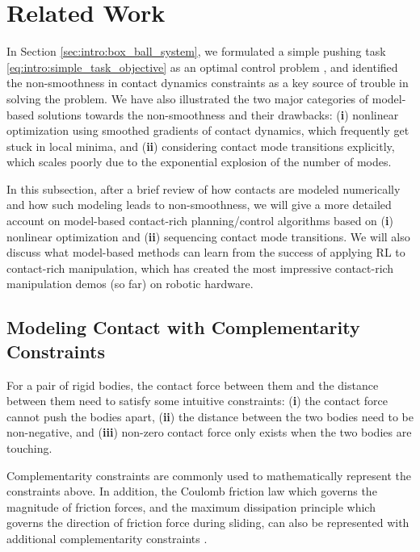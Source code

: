 \section{Related Work}
In Section \ref{sec:intro:box_ball_system}, we formulated a simple pushing task \eqref{eq:intro:simple_task_objective} as an optimal control problem \cite[]{underactuated}, and identified the non-smoothness in contact dynamics constraints as a key source of trouble in solving the problem. We have also illustrated the two major categories of model-based solutions towards the non-smoothness and their drawbacks: (\textbf{i}) nonlinear optimization using smoothed gradients of contact dynamics, which frequently get stuck in local minima, and (\textbf{ii}) considering contact mode transitions explicitly, which scales poorly due to the exponential explosion of the number of modes. 

In this subsection, after a brief review of how contacts are modeled numerically and how such modeling leads to non-smoothness, we will give a more detailed account on model-based contact-rich planning/control algorithms based on (\textbf{i}) nonlinear optimization and (\textbf{ii}) sequencing contact mode transitions. We will also discuss what model-based methods can learn from the success of applying RL to contact-rich manipulation, which has created the most impressive contact-rich manipulation demos (so far) on robotic hardware.


\subsection{Modeling Contact with Complementarity Constraints} 
\label{sec:intro:complementarity_constraints}
For a pair of rigid bodies, the contact force between them and the distance between them need to satisfy some intuitive constraints: (\textbf{i}) the contact force cannot push the bodies apart, (\textbf{ii}) the distance between the two bodies need to be non-negative, and (\textbf{iii}) non-zero contact force only exists when the two bodies are touching. 

Complementarity constraints are commonly used to mathematically represent the constraints above. In addition, the Coulomb friction law which governs the magnitude of friction forces, and the maximum dissipation principle which governs the direction of friction force during sliding, can also be represented with additional complementarity constraints \cite{stewart2000rigid, anitescu1997formulating}.

